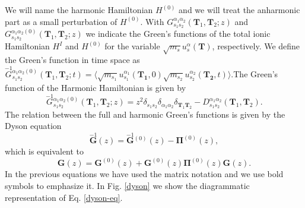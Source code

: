 We will name the harmonic Hamiltonian $H^{(0)}$ and we will treat the anharmonic part as a small perturbation of $H^{(0)}$. With $G_{s_{1}s_{2}}^{\alpha_{1}\alpha_{2}}(\mathbf{T}_{1},\mathbf{T}_{2};z)$ and 
$G_{s_{1}s_{2}}^{\alpha_{1}\alpha_{2}(0)}(\mathbf{T}_{1},\mathbf{T}_{2};z)$ we indicate the Green's functions of the total ionic Hamiltonian $H^{I}$ and $H^{(0)}$ for the variable $\sqrt{m_{s}}u_{s}^{\alpha}(\mathbf{T})$, 
respectively. We define the Green's function in time space as $\overset{-1}{G}{}_{s_{1}s_{2}}^{\alpha_{1}\alpha_{2}(0)}(\mathbf{T}_{1},\mathbf{T}_{2};t)=\langle\sqrt{m_{s_{1}}}u_{s_{1}}^{\alpha_{1}}(\mathbf{T_{1}},0)\sqrt{m_{s_{2}}}u_{s_{2}}^{\alpha_{2}}(\mathbf{T_{2}},t)\rangle$.The Green's function of the Harmonic Hamiltonian is given by
\begin{equation}
 \overset{-1}{G}{}_{s_{1}s_{2}}^{\alpha_{1}\alpha_{2}(0)}(\mathbf{T}_{1},\mathbf{T}_{2};z)=z^{2}\delta_{s_{1}s_{2}}\delta_{\alpha_{1}\alpha_{2}}\delta_{\mathbf{T}_{1}\mathbf{T}_{2}}-D_{s_{1}s_{2}}^{\alpha_{1}\alpha_{2}}(\mathbf{
 T}_{1},\mathbf{T}_{2}).
\end{equation}
The relation between the full and harmonic Green's functions is given by the Dyson equation
\begin{equation}
 \label{green-function}
 \overset{-1}{\mathbf{G}}(z)=\overset{-1}{\mathbf{G}}{}^{(0)}(z)-\boldsymbol{\Pi}^{(0)}(z),
\end{equation}
which is equivalent to
\begin{equation}
 \label{dyson-eq}
 \mathbf{G}(z)=\mathbf{G}^{(0)}(z)+\mathbf{G}^{(0)}(z)\boldsymbol{\Pi}^{(0)}(z)\mathbf{G}(z).
\end{equation}
In the previous equations we have used the matrix notation and we use bold symbols to emphasize it. In Fig. \ref{dyson} we show the diagrammatic representation of Eq. \ref{dyson-eq}. 
